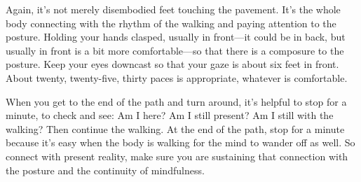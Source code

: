 Again, it’s not merely disembodied feet touching the pavement. It’s the
whole body connecting with the rhythm of the walking and paying
attention to the posture. Holding your hands clasped, usually in
front—it could be in back, but usually in front is a bit more
comfortable—so that there is a composure to the posture. Keep your eyes
downcast so that your gaze is about six feet in front. About twenty,
twenty-five, thirty paces is appropriate, whatever is comfortable.

When you get to the end of the path and turn around, it’s helpful to
stop for a minute, to check and see: Am I here? Am I still present? Am I
still with the walking? Then continue the walking. At the end of the
path, stop for a minute because it’s easy when the body is walking for
the mind to wander off as well. So connect with present reality, make
sure you are sustaining that connection with the posture and the
continuity of mindfulness.
